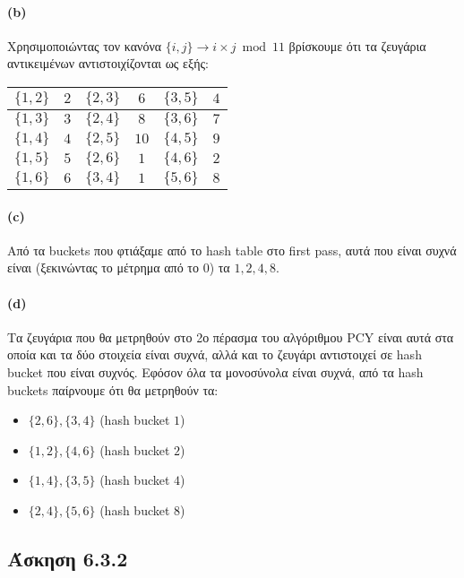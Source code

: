 \documentclass[a4paper,11pt]{article}
\begin{document}
\paragraph{(b)} Χρησιμοποιώντας τον κανόνα $\{i,j\} \rightarrow i \times j \bmod 11$ βρίσκουμε ότι τα ζευγάρια αντικειμένων αντιστοιχίζονται ως εξής:
\begin{center}
	\begin{tabular}{| c | c || c | c || c | c |}
		\hline
		$\{1,2\}$ & $2$ & $\{2,3\}$ & $6$ &$\{3,5\}$ & $4$ \\
		\hline
		$\{1,3\}$ & $3$ & $\{2,4\}$ & $8$ &$\{3,6\}$ & $7$ \\
		\hline
		$\{1,4\}$ & $4$ & $\{2,5\}$ & $10$ &$\{4,5\}$ & $9$ \\
		\hline
		$\{1,5\}$ & $5$ & $\{2,6\}$ & $1$ &$\{4,6\}$ & $2$ \\
		\hline
		$\{1,6\}$ & $6$ & $\{3,4\}$ & $1$ &$\{5,6\}$ & $8$ \\
		\hline
	\end{tabular}
\end{center}

\paragraph{(c)} Από τα buckets που φτιάξαμε από το hash table στο first pass, αυτά που είναι συχνά είναι (ξεκινώντας το μέτρημα από το $0$) τα $1,2,4,8$.

\paragraph{(d)} Τα ζευγάρια που θα μετρηθούν στο 2ο πέρασμα του αλγόριθμου PCY είναι αυτά στα οποία και τα δύο στοιχεία είναι συχνά, αλλά και το ζευγάρι αντιστοιχεί σε hash bucket που είναι συχνός.
Εφόσον όλα τα μονοσύνολα είναι συχνά, από τα hash buckets παίρνουμε ότι θα μετρηθούν τα:
\begin{itemize}
	\item $\{2,6\},\{3,4\}$ (hash bucket $1$)
	\item $\{1,2\},\{4,6\}$ (hash bucket $2$)
	\item $\{1,4\},\{3,5\}$ (hash bucket $4$)
	\item $\{2,4\},\{5,6\}$ (hash bucket $8$)
\end{itemize}


\subsection*{Άσκηση 6.3.2}
\end{document}

